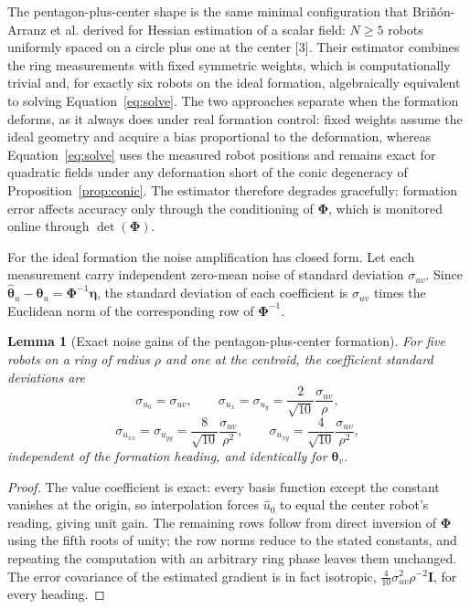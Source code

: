 \documentclass[12pt, letterpaper, oneside]{report}
\newtheorem{lemma}[theorem]{Lemma}
\begin{document}
The pentagon-plus-center shape is the same minimal configuration that
Briñón-Arranz et al. derived for Hessian estimation of a scalar field:
$N\geq5$ robots uniformly spaced on a circle plus one at the center [3].
Their estimator combines the ring measurements with fixed symmetric
weights, which is computationally trivial and, for exactly six robots on
the ideal formation, algebraically equivalent to solving
Equation~\eqref{eq:solve}. The two approaches separate when the formation
deforms, as it always does under real formation control: fixed weights
assume the ideal geometry and acquire a bias proportional to the
deformation, whereas Equation~\eqref{eq:solve} uses the measured robot
positions and remains exact for quadratic fields under any deformation
short of the conic degeneracy of Proposition~\ref{prop:conic}. The
estimator therefore degrades gracefully: formation error affects accuracy
only through the conditioning of $\boldsymbol{\Phi}$, which is monitored
online through $\det(\boldsymbol{\Phi})$.

For the ideal formation the noise amplification has closed form. Let each
measurement carry independent zero-mean noise of standard deviation
$\sigma_{uv}$. Since
$\hat{\boldsymbol{\theta}}_u-\boldsymbol{\theta}_u=\boldsymbol{\Phi}^{-1}\boldsymbol{\eta}$,
the standard deviation of each coefficient is $\sigma_{uv}$ times the
Euclidean norm of the corresponding row of $\boldsymbol{\Phi}^{-1}$.

\begin{lemma}[Exact noise gains of the pentagon-plus-center formation]
\label{lem:gains}
For five robots on a ring of radius $\rho$ and one at the centroid, the
coefficient standard deviations are
\begin{equation}
\sigma_{u_0} = \sigma_{uv}, \qquad
\sigma_{u_x} = \sigma_{u_y} = \frac{2}{\sqrt{10}}\frac{\sigma_{uv}}{\rho},
\label{eq:gain_grad}
\end{equation}
\begin{equation}
\sigma_{u_{xx}} = \sigma_{u_{yy}} = \frac{8}{\sqrt{10}}\frac{\sigma_{uv}}{\rho^2},
\qquad
\sigma_{u_{xy}} = \frac{4}{\sqrt{10}}\frac{\sigma_{uv}}{\rho^2},
\label{eq:gain_hess}
\end{equation}
independent of the formation heading, and identically for
$\boldsymbol{\theta}_v$.
\end{lemma}

\begin{proof}
The value coefficient is exact: every basis function except the constant
vanishes at the origin, so interpolation forces $\hat u_0$ to equal the
center robot's reading, giving unit gain. The remaining rows follow from
direct inversion of $\boldsymbol{\Phi}$ using the fifth roots of unity;
the row norms reduce to the stated constants, and repeating the
computation with an arbitrary ring phase leaves them unchanged. The error
covariance of the estimated gradient is in fact isotropic,
$\tfrac{4}{10}\sigma_{uv}^2\rho^{-2}\mathbf{I}$, for every heading.
\end{proof}
\end{document}
